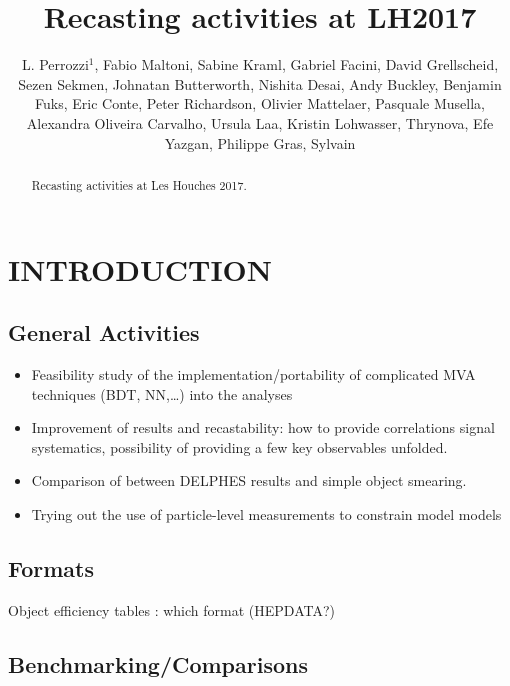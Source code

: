 \documentclass[11pt]{cernrep}
\begin{document}
\title{Recasting activities at LH2017}

\author{L. Perrozzi$^1$, Fabio Maltoni, Sabine Kraml, Gabriel Facini, David Grellscheid, Sezen Sekmen, Johnatan Butterworth, Nishita Desai, Andy Buckley, Benjamin Fuks, Eric Conte, Peter Richardson, Olivier Mattelaer, Pasquale Musella, Alexandra Oliveira Carvalho, Ursula Laa, Kristin Lohwasser, Thrynova, Efe Yazgan, Philippe Gras, Sylvain}

\maketitle

\begin{abstract}
Recasting activities at Les Houches 2017.
\end{abstract}

\section{INTRODUCTION}

\subsection{General Activities}

\begin{itemize}
\item Feasibility study of the implementation/portability of complicated MVA techniques (BDT, NN,…) into the analyses
\item Improvement of results and recastability: how to provide correlations signal systematics, possibility of providing a few key observables unfolded.
\item Comparison of between DELPHES results and simple object smearing.
\item Trying out the use of particle-level measurements to constrain model models
\end{itemize}

\subsection{Formats}
Object efficiency tables : which format (HEPDATA?)

\subsection{Benchmarking/Comparisons}
\end{document}
